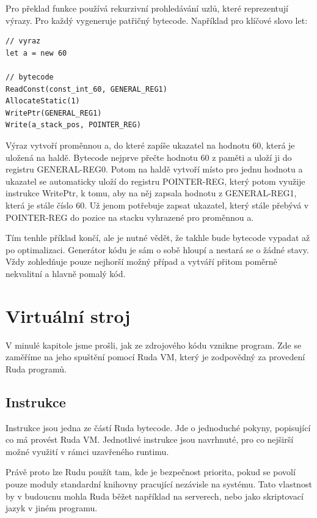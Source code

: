 \documentclass[12pt, a4paper,
twoside,        %
openright
]{report}
\let\oldchapter\chapter
\renewcommand{\chapter}{
	\clearpage
	\pagestyle{fancy}
	\oldchapter
}
\begin{document}
Pro překlad funkce používá rekurzivní prohledávání uzlů, které reprezentují výrazy. Pro každý vygeneruje patřičný bytecode. Například pro klíčové slovo let:

\begin{lstlisting}[caption={Překlad klíčového slova let}]
// vyraz
let a = new 60

// bytecode
ReadConst(const_int_60, GENERAL_REG1)
AllocateStatic(1)     
WritePtr(GENERAL_REG1)   
Write(a_stack_pos, POINTER_REG)  
\end{lstlisting}

Výraz vytvoří proměnnou a, do které zapíše ukazatel na hodnotu 60, která je uložená na haldě. Bytecode nejprve přečte hodnotu 60 z paměti a uloží ji do registru GENERAL-REG0. Potom na haldě vytvoří místo pro jednu hodnotu a ukazatel se automaticky uloží do registru POINTER-REG, který potom využije instrukce WritePtr, k tomu, aby na něj zapsala hodnotu z GENERAL-REG1, která je stále číslo 60. Už jenom potřebuje zapsat ukazatel, který stále přebývá v POINTER-REG do pozice na stacku vyhrazené pro proměnnou a.

Tím tenhle příklad končí, ale je nutné vědět, že takhle bude bytecode vypadat až po optimalizaci. Generátor kódu je sám o sobě hloupí a nestará se o žádné stavy. Vždy zohledňuje pouze nejhorší možný případ a vytváří přitom poměrně nekvalitní a hlavně pomalý kód.

\chapter{Virtuální stroj}

V minulé kapitole jsme prošli, jak ze zdrojového kódu vznikne program. Zde se zaměříme na jeho spuštění pomocí Ruda VM, který je zodpovědný za provedení Ruda programů.


\section{Instrukce}

Instrukce jsou jedna ze částí Ruda bytecode. Jde o jednoduché pokyny, popisující co má provést Ruda VM. Jednotlivé instrukce jsou navrhnuté, pro co nejširší možné využití v rámci uzavřeného runtimu. 

Právě proto lze Rudu použít tam, kde je bezpečnost priorita, pokud se povolí pouze moduly standardní knihovny pracující nezávisle na systému. Tato vlastnost by v budoucnu mohla Ruda běžet například na serverech, nebo jako skriptovací jazyk v jiném programu.
\end{document}
